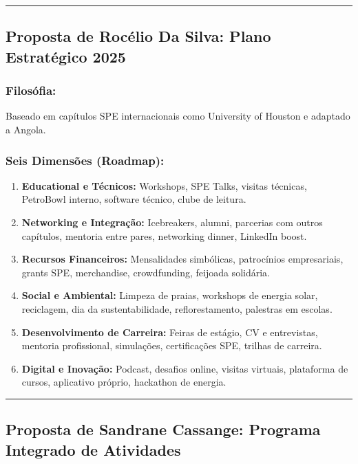 \documentclass[12pt,a4paper]{article}
\begin{document}
\textcolor{spe-secondary}{\hspace{0.5cm}\rule{0.4\linewidth}{0.8pt}}
\subsection{Proposta de Rocélio Da Silva: Plano Estratégico 2025}

\subsubsection*{Filosófia:}
Baseado em capítulos SPE internacionais como University of Houston e adaptado a Angola.

\subsubsection*{Seis Dimensões (Roadmap):}

\begin{enumerate}[itemsep=0.2cm]
    \item \textbf{Educational e Técnicos:} Workshops, SPE Talks, visitas técnicas, PetroBowl interno, software técnico, clube de leitura.
    
    \item \textbf{Networking e Integração:} Icebreakers, alumni, parcerias com outros capítulos, mentoria entre pares, networking dinner, LinkedIn boost.
    
    \item \textbf{Recursos Financeiros:} Mensalidades simbólicas, patrocínios empresariais, grants SPE, merchandise, crowdfunding, feijoada solidária.
    
    \item \textbf{Social e Ambiental:} Limpeza de praias, workshops de energia solar, reciclagem, dia da sustentabilidade, reflorestamento, palestras em escolas.
    
    \item \textbf{Desenvolvimento de Carreira:} Feiras de estágio, CV e entrevistas, mentoria profissional, simulações, certificações SPE, trilhas de carreira.
    
    \item \textbf{Digital e Inovação:} Podcast, desafios online, visitas virtuais, plataforma de cursos, aplicativo próprio, hackathon de energia.
\end{enumerate}

\textcolor{spe-secondary}{\hspace{0.5cm}\rule{0.4\linewidth}{0.8pt}}
\subsection{Proposta de Sandrane Cassange: Programa Integrado de Atividades}
\end{document}
